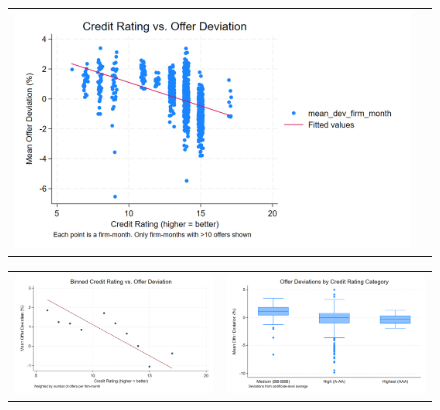 \documentclass[12pt]{article}
\begin{document}
\begin{figure}[H]
\caption{}
 \label{fig:ie4_4}
\centering{}%
\begin{tabular}{cc}
\includegraphics[scale=0.27]{figures/IE4/IE4_scatter_rating_offer.png} 
\end{tabular}
\end{figure}

\begin{figure}[H]
\caption{}
 \label{fig:ie4_5and6}
\centering{}%
\begin{tabular}{cc}
\includegraphics[scale=0.27]{figures/IE4/IE4_binscatter_rating_offer.png} & \includegraphics[scale=0.27]{figures/IE4/IE4_box_rating_offer.png}
\end{tabular}
\end{figure}
\end{document}
